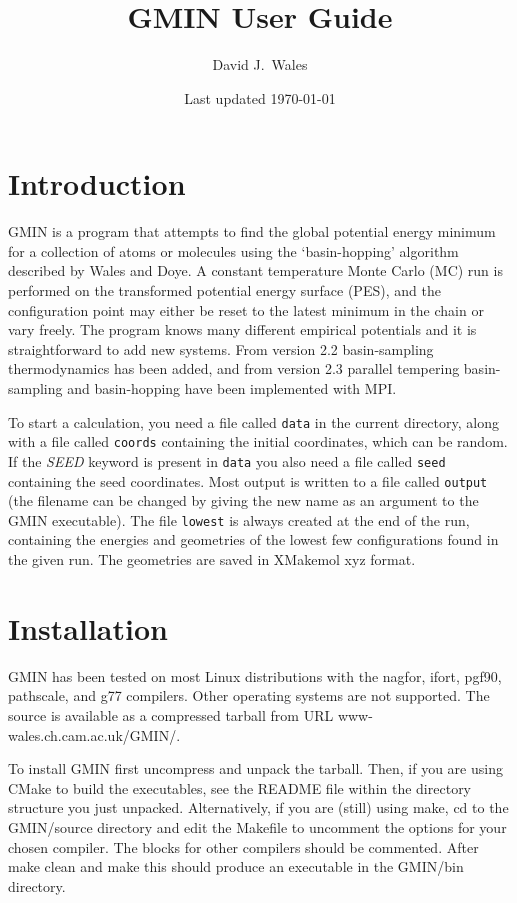 \documentclass[12pt,a4paper,dvips]{article}
\begin{document}
\title{GMIN User Guide}
\author{David J.~Wales}
\date{Last updated \today}
\maketitle

\clearpage
{}
{} %
\tableofcontents
\section{Introduction}

GMIN is a program that attempts to find the global potential energy minimum
for a collection of atoms or molecules using the `basin-hopping' algorithm
described by Wales and Doye.\cite{walesd97a}
A constant temperature Monte Carlo (MC) run is performed on the transformed
potential energy surface (PES), and the configuration point may either be reset 
to the latest minimum in the chain or vary freely.
The program knows many different empirical potentials and it is straightforward to add new systems.
From version 2.2 basin-sampling thermodynamics has been added, and from 
version 2.3 parallel tempering basin-sampling and basin-hopping have been
implemented with MPI.

To start a calculation, you need a file called {\tt data} in the current directory,
along with a file called {\tt coords} containing the initial coordinates,
which can be random. If the {\it SEED} keyword is present in
{\tt data} you also need a file called {\tt seed} containing the seed coordinates.
Most output is written to a file called {\tt output} (the filename can be changed by giving the 
new name as an argument to the GMIN executable). The file {\tt lowest} is always created
at the end of the run, containing the energies and geometries of the lowest few
configurations found in the given run. The geometries are saved in XMakemol xyz format.

\section{Installation}

GMIN has been tested on most Linux distributions with the nagfor, ifort, pgf90,
pathscale, and g77 compilers.
Other operating systems are not supported.
The source is available as a compressed tarball from URL www-wales.ch.cam.ac.uk/GMIN/.

To install GMIN first uncompress and unpack the tarball. Then, if you are using CMake to build 
the executables, see the README file within the directory structure you just unpacked.
Alternatively, if you are (still) using make, cd to the GMIN/source directory 
and edit the Makefile to uncomment the options for your chosen compiler. The blocks
for other compilers should be commented. After make clean and make this should produce
an executable in the GMIN/bin directory.
\end{document}
